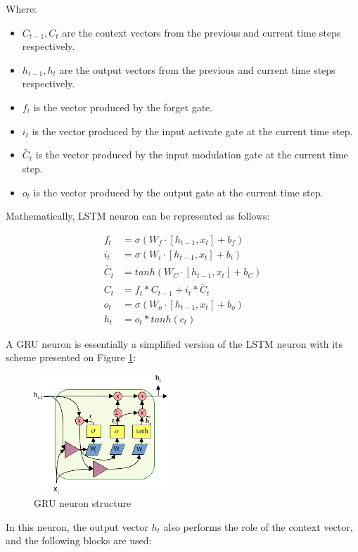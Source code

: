 \documentclass[sn-apa]{sn-jnl}%
\begin{document}
Where:
\begin{itemize}
\item $C_{t-1},C_t$ are the context vectors from the  previous and current time steps respectively.
\item $h_{t-1}, h_t$ are the output vectors from the previous and current time steps respectively.
\item $f_t$ is the vector produced by the forget gate.
\item $i_t$ is the vector produced by the input activate gate at the current time step.
\item $\tilde{C_t}$ is the vector produced by the input modulation gate at the current time step.
\item $o_t$ is the vector produced by the output gate at the current time step.
\end{itemize}

Mathematically, LSTM neuron can be represented as follows:

\begin{align}
f_t &= \sigma( W_f \cdot [h_{t-1},x_t] + b_f) \nonumber \\
i_t &= \sigma( W_i \cdot [h_{t-1},x_t] + b_i) \nonumber \\
\tilde{C_t} &= tanh( W_C \cdot [h_{t-1},x_t] + b_C) \nonumber \\
C_t &= f_t * C_{t-1} + i_t * \tilde{C_t} \nonumber \\
o_t &= \sigma( W_o \cdot [h_{t-1},x_t] + b_o) \nonumber \\
h_t &= o_t * tanh(c_t) \label{eq6}
\end{align}

A GRU neuron is essentially a simplified version of the LSTM neuron with its scheme presented on Figure \ref{fig2}:
\begin{figure}[H]
\centering
\includegraphics[width=0.45\textwidth]{Fig2.png}
\caption{GRU neuron structure}\label{fig2}
\end{figure}

In this neuron, the output vector $h_t$ also performs the role of the context vector, and the following blocks are used:
\end{document}
